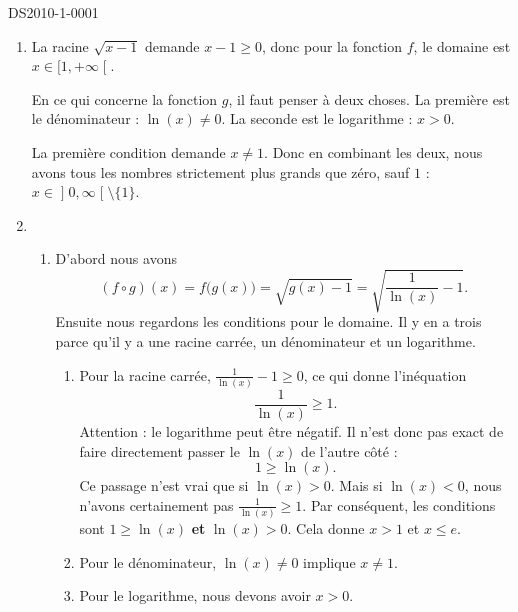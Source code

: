 
\begin{corrige}{DS2010-1-0001}

	\begin{enumerate}
		\item
			La racine $\sqrt{x-1}$ demande $x-1\geq 0$, donc pour la fonction $f$, le domaine est $x\in\mathopen[ 1, +\infty  \mathclose[$.

			En ce qui concerne la fonction $g$, il faut penser à deux choses. La première est le dénominateur : $\ln(x)\neq 0$. La seconde est le logarithme : $x>0$.

			La première condition demande $x\neq 1$. Donc en combinant les deux, nous avons tous les nombres strictement plus grands que zéro, sauf $1$ : $x\in\mathopen] 0 , \infty \mathclose[\setminus\{ 1 \}$.

		\item
			\begin{enumerate}
				\item
					D'abord nous avons
					\begin{equation}
						(f\circ g)(x)=f\big( g(x) \big)=\sqrt{g(x)-1}=\sqrt{\frac{1}{ \ln(x) }-1}.
					\end{equation}
					Ensuite nous regardons les conditions pour le domaine. Il y en a trois parce qu'il y a une racine carrée, un dénominateur et un logarithme.
					\begin{enumerate}
						\item
							Pour la racine carrée, $\frac{1}{ \ln(x) }-1\geq 0$, ce qui donne l'inéquation
							\begin{equation}
								\frac{1}{ \ln(x) }\geq 1.
							\end{equation}
							Attention : le logarithme peut être négatif. Il n'est donc pas exact de faire directement passer le $\ln(x)$ de l'autre côté :
							\begin{equation}
								1\geq\ln(x).
							\end{equation}
							Ce passage n'est vrai que si $\ln(x)>0$. Mais si $\ln(x)<0$, nous n'avons certainement pas $\frac{1}{ \ln(x) }\geq 1$. Par conséquent, les conditions sont $1\geq\ln(x)$ {\bf et} $\ln(x)>0$. Cela donne $x>1$ et $x\leq e$.
						\item
							Pour le dénominateur, $\ln(x)\neq 0$ implique $x\neq 1$.
						\item
							Pour le logarithme, nous devons avoir $x>0$.


\end{enumerate}
\end{enumerate}
\end{enumerate}
\end{corrige}
